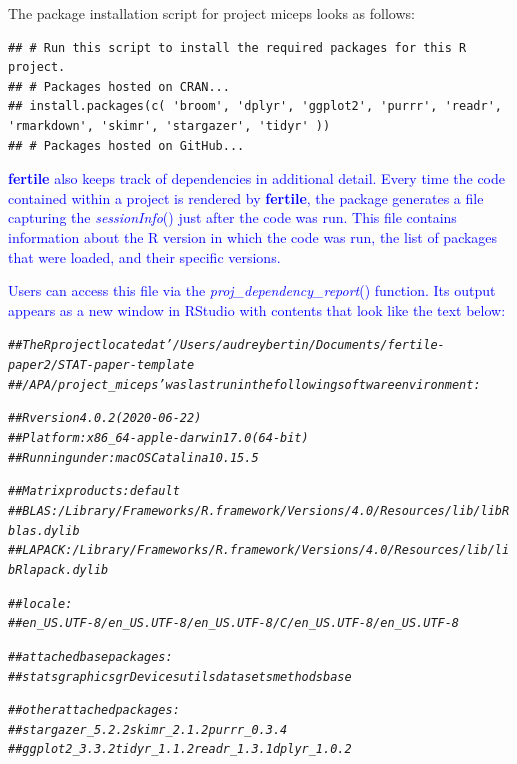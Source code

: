 \documentclass[APA,LATO1COL]{WileyNJD-v2}\usepackage[]{graphicx}\usepackage[]{color}
\makeatletter
\newcommand{\hlcom}[1]{\textcolor[rgb]{0.678,0.584,0.686}{\textit{#1}}}%
\newenvironment{kframe}{%
 \def\at@end@of@kframe{}%
 \ifinner\ifhmode%
  \def\at@end@of@kframe{\end{minipage}}%
  \begin{minipage}{\columnwidth}%
 \fi\fi%
 \def\FrameCommand##1{\hskip\@totalleftmargin \hskip-\fboxsep
 \colorbox{shadecolor}{##1}\hskip-\fboxsep
     \hskip-\linewidth \hskip-\@totalleftmargin \hskip\columnwidth}%
 \MakeFramed {\advance\hsize-\width
   \@totalleftmargin\z@ \linewidth\hsize
   \@setminipage}}%
 {\par\unskip\endMakeFramed%
 \at@end@of@kframe}
\newenvironment{knitrout}{}{} %
\newcommand{\R}{\textsf{R}\xspace}
\newcommand{\pkg}[1]{\textbf{#1}}
\newcommand{\func}[1]{\textit{#1}()}
\makeatother
\begin{document}
The package installation script for project miceps looks as follows:

\begin{knitrout}
\color{fgcolor}\begin{kframe}
\begin{verbatim}
## # Run this script to install the required packages for this R project.
## # Packages hosted on CRAN...
## install.packages(c( 'broom', 'dplyr', 'ggplot2', 'purrr', 'readr', 'rmarkdown', 'skimr', 'stargazer', 'tidyr' ))
## # Packages hosted on GitHub...
\end{verbatim}
\end{kframe}
\end{knitrout}

\textcolor{blue}{\pkg{fertile} also keeps track of dependencies in additional detail. Every time the code contained within a project is rendered by \pkg{fertile}, the package generates a file capturing the \func{sessionInfo} just after the code was run. This file contains information about the \R version in which the code was run, the list of packages that were loaded, and their specific versions.}

\textcolor{blue}{Users can access this file via the \func{proj\_dependency\_report} function. Its output appears as a new window in RStudio with contents that look like the text below:}

\begin{knitrout}
\color{fgcolor}\begin{kframe}
\begin{alltt}
\hlcom{##  The R project located at '/Users/audreybertin/Documents/fertile-paper2/STAT-paper-template}
\hlcom{##  /APA/project_miceps' was last run in the following software environment:}

\hlcom{##  R version 4.0.2 (2020-06-22)}
\hlcom{##  Platform: x86_64-apple-darwin17.0 (64-bit)}
\hlcom{##  Running under: macOS Catalina 10.15.5}

\hlcom{##  Matrix products: default}
\hlcom{##  BLAS:   /Library/Frameworks/R.framework/Versions/4.0/Resources/lib/libRblas.dylib}
\hlcom{##  LAPACK: /Library/Frameworks/R.framework/Versions/4.0/Resources/lib/libRlapack.dylib}

\hlcom{##  locale:}
\hlcom{##  en_US.UTF-8/en_US.UTF-8/en_US.UTF-8/C/en_US.UTF-8/en_US.UTF-8}

\hlcom{##  attached base packages:}
\hlcom{##  stats     graphics  grDevices utils     datasets  methods   base     }

\hlcom{##  other attached packages:}
\hlcom{##  stargazer_5.2.2    skimr_2.1.2        purrr_0.3.4       }
\hlcom{##  ggplot2_3.3.2      tidyr_1.1.2        readr_1.3.1        dplyr_1.0.2}
\end{alltt}
\end{kframe}
\end{knitrout}
\end{document}
